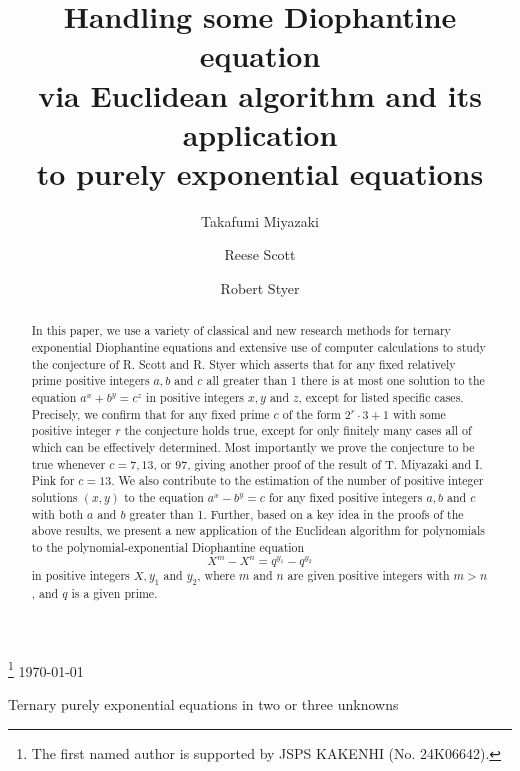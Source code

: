 \documentclass[11pt]{amsart}
\numberwithin{equation}{section}
\begin{document}
\title%
{Handling some Diophantine equation \\ via Euclidean algorithm and its application \\ to purely exponential equations}
%
\author{Takafumi Miyazaki}
\address{Takafumi Miyazaki
\hfill\break\indent Gunma University, Division of Pure and Applied Science,
\hfill\break\indent Graduate School of Science and Technology
\hfill\break\indent Tenjin-cho 1-5-1, Kiryu 376-8515.
\hfill\break\indent Japan
}
%
\author{Reese Scott}
\address{Reese Scott
\hfill\break\indent Somerville, MA.
\hfill\break\indent USA}

\author{Robert Styer}
\address{Robert Styer
\hfill\break\indent Department of Mathematics and Statistics, Villanova University
\hfill\break\indent Villanova, pa 19085.
\hfill\break\indent USA}
%

\thanks{The first named author is supported by JSPS KAKENHI (No. 24K06642).}
\today
{}

\maketitle

{Ternary purely exponential equations in two or three unknowns}

\vspace{-0.5cm}
\begin{abstract}%
In this paper, we use a variety of classical and new research methods for ternary exponential Diophantine equations and extensive use of computer calculations to study the conjecture of R. Scott and R. Styer which asserts that for any fixed relatively prime positive integers $a,b$ and $c$ all greater than 1 there is at most one solution to the equation $a^x+b^y=c^z$ in positive integers $x,y$ and $z$, except for listed specific cases.
Precisely, we confirm that for any fixed prime $c$ of the form $2^r \cdot 3 +1$ with some positive integer $r$ the conjecture holds true, except for only finitely many cases all of which can be effectively determined.
Most importantly we prove the conjecture to be true whenever $c = 7, 13$, or $97$, giving another proof of the result of T. Miyazaki and I. Pink for $c=13$.
We also contribute to the estimation of the number of positive integer solutions $(x,y)$ to the equation $a^x-b^y=c$ for any fixed positive integers $a,b$ and $c$ with both $a$ and $b$ greater than 1.
Further, based on a key idea in the proofs of the above results, we present a new application of the Euclidean algorithm for polynomials to the polynomial-exponential Diophantine equation
\[
X^m - X^n = q^{y_1} - q^{y_2}
\]
in positive integers $X, y_1$ and $y_2$, where $m$ and $n$ are given positive integers with $m>n$, and $q$ is a given prime.
\end{abstract}
\end{document}
